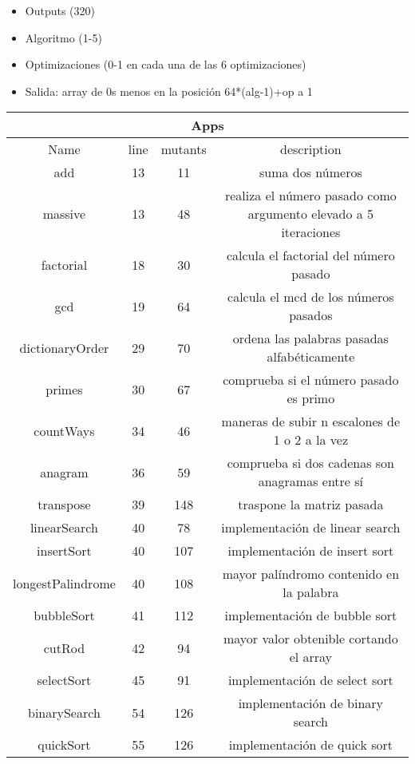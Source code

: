 \documentclass{article}
\begin{document}
\begin{itemize}
    \item Outputs (320)
    \item Algoritmo (1-5)
    \item Optimizaciones (0-1 en cada una de las 6 optimizaciones)
    \item Salida: array de 0s menos en la posición 64*(alg-1)+op a 1
\end{itemize}
\begin{adjustwidth}{-2.5cm}{0cm}
\begin{tabular}{ |c||c|c|c|  }
 \hline
 \multicolumn{4}{|c|}{Apps} \\
 \hline
 Name & line & mutants & description \\
 \hline
 \hline
  add & 13 & 11 & suma dos números \\ \hline
 massive & 13 & 48 & realiza el número pasado como argumento elevado a 5 iteraciones \\ \hline
 factorial & 18 & 30 & calcula el factorial del número pasado \\ \hline
 gcd & 19 & 64 & calcula el mcd de los números pasados \\ \hline
 dictionaryOrder & 29 & 70 & ordena las palabras pasadas alfabéticamente \\ \hline
 primes & 30 & 67 & comprueba si el número pasado es primo \\ \hline
 countWays & 34 & 46 & maneras de subir n escalones de 1 o 2 a la vez \\ \hline
 anagram & 36 & 59 & comprueba si dos cadenas son anagramas entre sí \\ \hline
 transpose & 39 & 148 & traspone la matriz pasada \\ \hline
 linearSearch & 40 & 78 & implementación de linear search \\ \hline
 insertSort & 40 & 107 & implementación de insert sort \\ \hline
 longestPalindrome & 40 & 108 & mayor palíndromo contenido en la palabra \\ \hline
 bubbleSort & 41 & 112 & implementación de bubble sort \\ \hline
 cutRod & 42 & 94 & mayor valor obtenible cortando el array \\ \hline
 selectSort & 45 & 91 & implementación de select sort \\ \hline
 binarySearch & 54 & 126 & implementación de binary search \\ \hline
 quickSort & 55 & 126 & implementación de quick sort \\ \hline

\end{tabular}
\end{adjustwidth}
\end{document}

